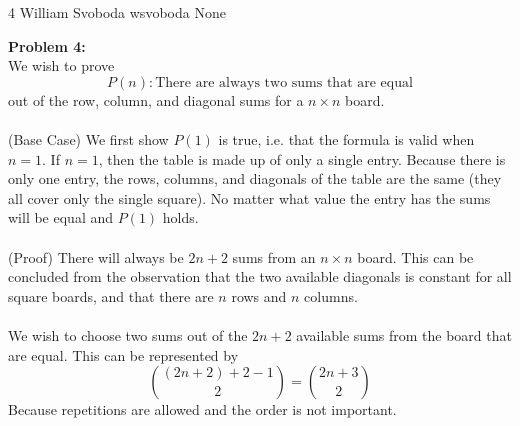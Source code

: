 \documentclass[12pt,letterpaper]{cos340hw}
\begin{document}
           {4}            %
           {William Svoboda}  %
           {wsvoboda}   %
           {None} 




\noindent\textbf{Problem 4:}\\
We wish to prove
$$P(n): \textrm{There are always two sums that are equal}$$
out of the row, column, and diagonal sums for a $n\times n$ board.\\\\
(Base Case) We first show $P(1)$ is true, i.e. that the formula is valid when $n=1$. If $n=1$, then the
table is made up of only a single entry. Because there is only one entry, the rows, columns, and 
diagonals of the table are the same (they all cover only the single square). No matter what value the 
entry has the sums will be equal and $P(1)$ holds.\\\\
(Proof) There will always be $2n+2$ sums from an $n\times n$ board. This can be concluded from the
observation that the two available diagonals is constant for all square boards, and that there are $n$ 
rows and $n$ columns.\\\\
We wish to choose two sums out of the $2n+2$ available sums from the board that are equal. This can
be represented by
$$\binom{(2n+2)+2-1}{2}=\binom{2n+3}{2}$$
Because repetitions are allowed and the order is not important.

\end{document}
